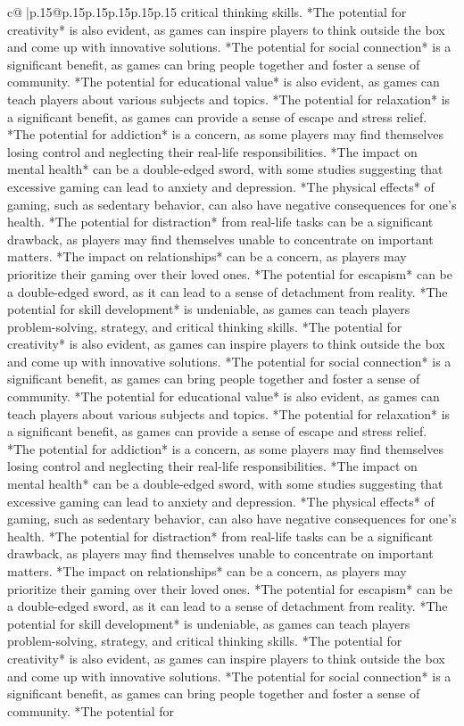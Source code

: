 \documentclass{article}
\begin{document}
{\begin{supertabular}{c@{$\;$}|p{.15\linewidth}@{}p{.15\linewidth}p{.15\linewidth}p{.15\linewidth}p{.15\linewidth}p{.15\linewidth}}
{{{critical thinking skills. *The potential for creativity* is also evident, as games can inspire players to think outside the box and come up with innovative solutions. *The potential for social connection* is a significant benefit, as games can bring people together and foster a sense of community. *The potential for educational value* is also evident, as games can teach players about various subjects and topics. *The potential for relaxation* is a significant benefit, as games can provide a sense of escape and stress relief. *The potential for addiction* is a concern, as some players may find themselves losing control and neglecting their real{-}life responsibilities. *The impact on mental health* can be a double{-}edged sword, with some studies suggesting that excessive gaming can lead to anxiety and depression. *The physical effects* of gaming, such as sedentary behavior, can also have negative consequences for one's health. *The potential for distraction* from real{-}life tasks can be a significant drawback, as players may find themselves unable to concentrate on important matters. *The impact on relationships* can be a concern, as players may prioritize their gaming over their loved ones. *The potential for escapism* can be a double{-}edged sword, as it can lead to a sense of detachment from reality. *The potential for skill development* is undeniable, as games can teach players problem{-}solving, strategy, and critical thinking skills. *The potential for creativity* is also evident, as games can inspire players to think outside the box and come up with innovative solutions. *The potential for social connection* is a significant benefit, as games can bring people together and foster a sense of community. *The potential for educational value* is also evident, as games can teach players about various subjects and topics. *The potential for relaxation* is a significant benefit, as games can provide a sense of escape and stress relief. *The potential for addiction* is a concern, as some players may find themselves losing control and neglecting their real{-}life responsibilities. *The impact on mental health* can be a double{-}edged sword, with some studies suggesting that excessive gaming can lead to anxiety and depression. *The physical effects* of gaming, such as sedentary behavior, can also have negative consequences for one's health. *The potential for distraction* from real{-}life tasks can be a significant drawback, as players may find themselves unable to concentrate on important matters. *The impact on relationships* can be a concern, as players may prioritize their gaming over their loved ones. *The potential for escapism* can be a double{-}edged sword, as it can lead to a sense of detachment from reality. *The potential for skill development* is undeniable, as games can teach players problem{-}solving, strategy, and critical thinking skills. *The potential for creativity* is also evident, as games can inspire players to think outside the box and come up with innovative solutions. *The potential for social connection* is a significant benefit, as games can bring people together and foster a sense of community. *The potential for }}}
\end{supertabular}}
\end{document}
